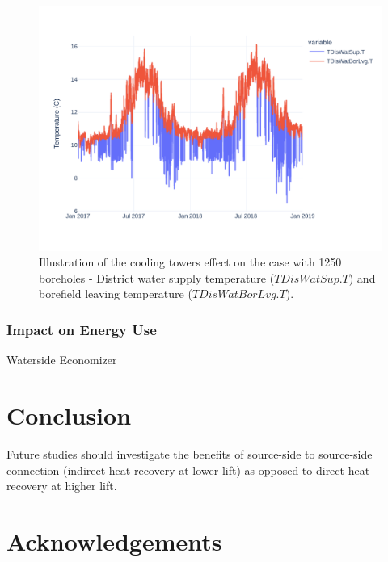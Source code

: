 \begin{figure}[!htbp]
\centering
\includegraphics[width=\linewidth]{figures/GeoBestCaseT.pdf}
\caption{Illustration of the cooling towers effect on the case with 1250 boreholes - District water supply temperature ($TDisWatSup.T$) and borefield leaving temperature ($TDisWatBorLvg.T$).}
\label{fig:coolingeffect}
\end{figure}


\subsubsection{Impact on Energy Use} \label{sec:energy}

Waterside Economizer







\section{Conclusion} \label{sec:concl}


Future studies should investigate the benefits of source-side to source-side connection (indirect heat recovery at lower lift) as opposed to direct heat recovery at higher lift.

\section{Acknowledgements} \label{sec:acknowledge}
